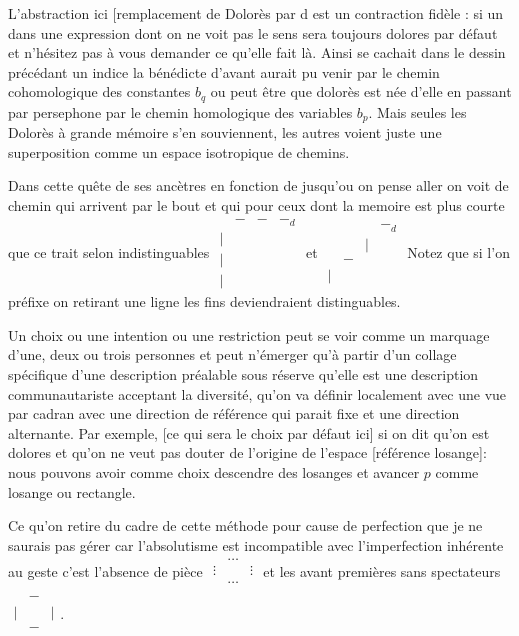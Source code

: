 \documentclass{article}
\begin{document}
L'abstraction ici [remplacement de Dolorès par d est un contraction fidèle : si un dans une expression dont on ne voit pas le sens sera toujours dolores par défaut et n'hésitez pas à vous demander ce qu'elle fait là. Ainsi se cachait dans le dessin précédant un indice la bénédicte d'avant aurait pu venir par le chemin cohomologique des constantes $b_q$ ou peut être que dolorès est née d'elle en passant par persephone par le chemin homologique des variables $b_p$. Mais seules les Dolorès à grande mémoire s'en souviennent, les autres voient juste une superposition  comme un espace isotropique de chemins.
 
Dans cette quête de ses ancètres en fonction de jusqu'ou on pense aller on voit de chemin qui arrivent par le  bout et qui pour ceux dont la memoire est plus courte que ce trait selon indistinguables
$\begin{matrix} 
&-&-&-_d\\
|&&&\\
 |&&&\\
|&&&
\end{matrix}$
 et 
$\begin{matrix} 
&&&-_d\\
&&|&\\
 &-&&\\
|&&&
\end{matrix} $ Notez que si l'on préfixe on retirant une ligne les fins deviendraient distinguables. %


Un choix ou une intention ou une restriction peut se voir comme un marquage d'une, deux ou trois personnes et peut n'émerger qu'à partir d'un collage spécifique d'une description préalable sous réserve qu'elle est une description communautariste acceptant la diversité,
 qu'on va  définir localement avec une vue par cadran avec une direction de référence qui parait fixe et une direction alternante. 
Par exemple, [ce qui sera le choix par défaut ici]  si on dit qu'on est dolores et qu'on ne veut pas douter de l'origine de l'espace [référence  losange]: nous pouvons avoir comme choix  descendre  des losanges et avancer  $p$ comme losange ou rectangle.   

Ce qu'on retire du cadre de cette méthode pour cause de perfection que je ne saurais pas gérer car l'absolutisme est incompatible avec l'imperfection inhérente au geste c'est l'absence de pièce  
$\begin{matrix} 
&\ldots&\\
\vdots&&\vdots\\
 &\ldots&\\
\end{matrix}$ et les avant premières sans spectateurs 
$\begin{matrix} 
&-&\\
|&&|\\
 &-&\\
\end{matrix}$.
\end{document}
